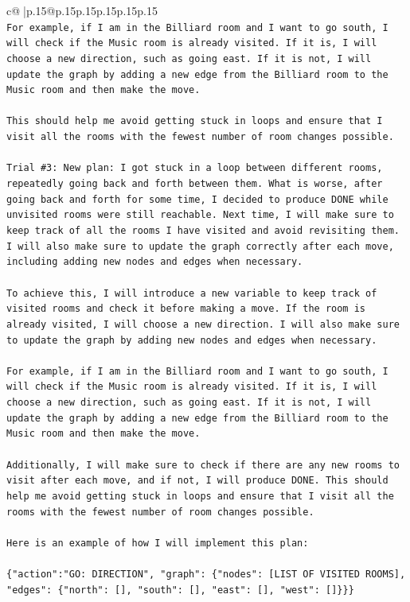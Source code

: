\documentclass{article}
\begin{document}
{\begin{supertabular}{c@{$\;$}|p{.15\linewidth}@{}p{.15\linewidth}p{.15\linewidth}p{.15\linewidth}p{.15\linewidth}p{.15\linewidth}}
{{{\\ 
\texttt{For example, if I am in the Billiard room and I want to go south, I will check if the Music room is already visited. If it is, I will choose a new direction, such as going east. If it is not, I will update the graph by adding a new edge from the Billiard room to the Music room and then make the move. } \\
\\ 
\texttt{This should help me avoid getting stuck in loops and ensure that I visit all the rooms with the fewest number of room changes possible.} \\
\\ 
\texttt{Trial \#3: New plan: I got stuck in a loop between different rooms, repeatedly going back and forth between them. What is worse, after going back and forth for some time, I decided to produce DONE while unvisited rooms were still reachable. Next time, I will make sure to keep track of all the rooms I have visited and avoid revisiting them. I will also make sure to update the graph correctly after each move, including adding new nodes and edges when necessary. } \\
\\ 
\texttt{To achieve this, I will introduce a new variable to keep track of visited rooms and check it before making a move. If the room is already visited, I will choose a new direction. I will also make sure to update the graph by adding new nodes and edges when necessary. } \\
\\ 
\texttt{For example, if I am in the Billiard room and I want to go south, I will check if the Music room is already visited. If it is, I will choose a new direction, such as going east. If it is not, I will update the graph by adding a new edge from the Billiard room to the Music room and then make the move. } \\
\\ 
\texttt{Additionally, I will make sure to check if there are any new rooms to visit after each move, and if not, I will produce DONE. This should help me avoid getting stuck in loops and ensure that I visit all the rooms with the fewest number of room changes possible. } \\
\\ 
\texttt{Here is an example of how I will implement this plan:} \\
\\ 
\texttt{\{"action":"GO: DIRECTION", "graph": \{"nodes": {[}LIST OF VISITED ROOMS{]}, "edges": \{"north": {[}{]}, "south": {[}{]}, "east": {[}{]}, "west": {[}{]}\}\}\}} \\
}}}
\end{supertabular}}
\end{document}
